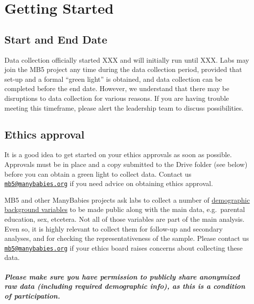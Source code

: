 \documentclass[
]{book}
\begin{document}
\hypertarget{getting-started}{%
\chapter{Getting Started}\label{getting-started}}

\hypertarget{start-and-end-date}{%
\section{Start and End Date}\label{start-and-end-date}}

Data collection officially started XXX and will initially run until XXX. Labs may join the MB5 project any time during the data collection period, provided that set-up and a formal ``green light'' is obtained, and data collection can be completed before the end date. However, we understand that there may be disruptions to data collection for various reasons. If you are having trouble meeting this timeframe, please alert the leadership team to discuss possibilities.

\hypertarget{ethics-approval}{%
\section{Ethics approval}\label{ethics-approval}}

It is a good idea to get started on your ethics approvals as soon as possible. Approvals must be in place and a copy submitted to the Drive folder (see below) before you can obtain a green light to collect data. Contact us \href{mailto:mb5@manybabies.org}{\nolinkurl{mb5@manybabies.org}} if you need advice on obtaining ethics approval.

MB5 and other ManyBabies projects ask labs to collect a number of \href{ADD\%20LINK\%20TO\%20PARTICIPANTS\%20SECTION}{demographic background variables} to be made public along with the main data, e.g.~parental education, sex, etcetera. Not all of those variables are part of the main analysis. Even so, it is highly relevant to collect them for follow-up and secondary analyses, and for checking the representativeness of the sample. Please contact us \href{mailto:mb5@manybabies.org}{\nolinkurl{mb5@manybabies.org}} if your ethics board raises concerns about collecting these data.

\hypertarget{please-make-sure-you-have-permission-to-publicly-share-anonymized-raw-data-including-required-demographic-info-as-this-is-a-condition-of-participation.}{%
\paragraph*{Please make sure you have permission to publicly share anonymized raw data (including required demographic info), as this is a condition of participation.}\label{please-make-sure-you-have-permission-to-publicly-share-anonymized-raw-data-including-required-demographic-info-as-this-is-a-condition-of-participation.}}
\end{document}
